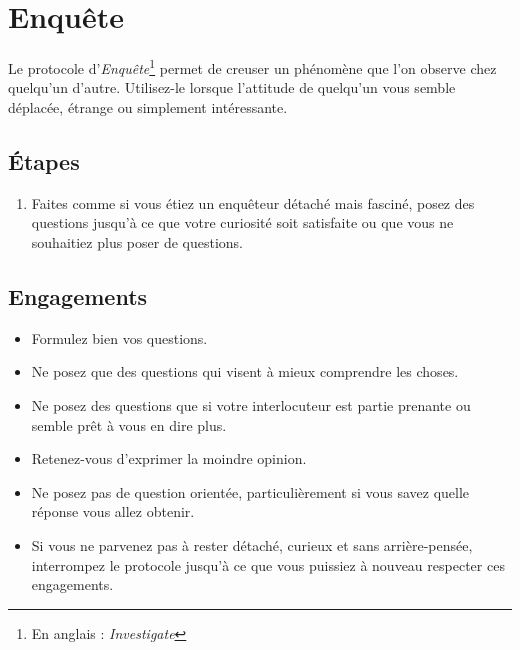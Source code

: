 \documentclass[paper=6in:9in,pagesize=pdftex,headinclude=on,footinclude=on,12pt]{scrbook}
\begin{document}
\section{Enquête} \label{protocole-enquete}

Le protocole d'\emph{Enquête}\footnote{En anglais : \emph{Investigate}} permet de creuser un phénomène que l'on observe chez quelqu'un d'autre.
Utilisez-le lorsque l'attitude de quelqu'un vous semble déplacée, étrange ou simplement intéressante.

\subsection{Étapes}
\begin{enumerate}
	\item Faites comme si vous étiez un enquêteur détaché mais fasciné, posez des questions jusqu'à ce que votre curiosité soit satisfaite ou que vous
	      ne souhaitiez plus poser de questions.
\end{enumerate}

\subsection{Engagements}
\begin{itemize}
	\item Formulez bien vos questions.
	\item Ne posez que des questions qui visent à mieux comprendre les choses.
	\item Ne posez des questions que si votre interlocuteur est partie prenante ou semble prêt à vous en dire plus.
	\item Retenez-vous d'exprimer la moindre opinion.
	\item Ne posez pas de question orientée, particulièrement si vous savez quelle réponse vous allez obtenir.
	\item Si vous ne parvenez pas à rester détaché, curieux et sans arrière-pensée, interrompez le protocole jusqu'à ce que vous puissiez à nouveau
	      respecter ces engagements.
\end{itemize}
\end{document}
